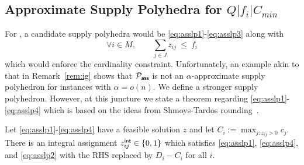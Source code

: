 \subsection{Approximate Supply Polyhedra for $Q|f_i|C_{min}$}
For \cckp, a candidate supply polyhedra would be \eqref{eq:asslp1}-\eqref{eq:asslp3} along with
\begin{equation}
\textstyle \forall i\in M, \qquad \sum_{j\in J} z_{ij} ~\leq~ f_i \tag{A4} \label{eq:asslp4}
\end{equation}
which would enforce the cardinality constraint. Unfortunately, an example akin to that in Remark~\ref{rem:ig} shows that ${\cal P}_\mathsf{ass}$ is not
an $\alpha$-approximate supply polyhedron for \cckp instances with $\alpha = o(n)$. We define a stronger supply polyhedron.
However, at this juncture we state a theorem regarding \eqref{eq:asslp1}-\eqref{eq:asslp4} which 
is based on the ideas from Shmoys-Tardos rounding~\cite{ShmoysT93}. 
\begin{theorem}
	\label{thm:shmoystardos}
	Let \eqref{eq:asslp1}-\eqref{eq:asslp4} have a feasible solution $z$ and let $C_i := \max_{j:z_{ij}>0} c_j$. 
There is an integral assignment $z^{\mathsf{int}}_{ij}\in \{0,1\}$ which satisfies \eqref{eq:asslp1}, \eqref{eq:asslp4}, and \eqref{eq:asslp2} with the RHS replaced by $D_i - C_i$ for all $i$.
\end{theorem}

